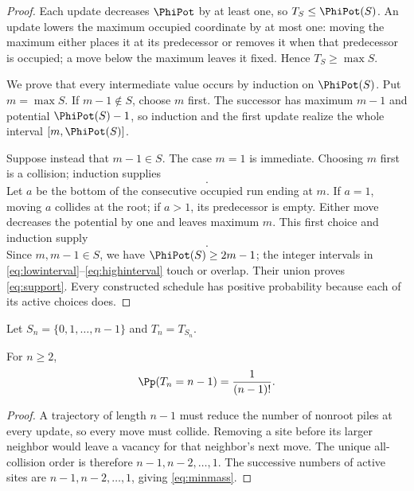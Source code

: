 \begin{proof}
Each update decreases $\PhiPot$ by at least one, so $T_S\leq\PhiPot(S)$.
An update lowers the maximum occupied coordinate by at most one: moving the
maximum either places it at its predecessor or removes it when that
predecessor is occupied; a move below the maximum leaves it fixed.  Hence
$T_S\geq\max S$.

We prove that every intermediate value occurs by induction on
$\PhiPot(S)$.  Put $m=\max S$.  If $m-1\notin S$, choose $m$ first.  The
successor has maximum $m-1$ and potential $\PhiPot(S)-1$, so induction and
the first update realize the whole interval $[m,\PhiPot(S)]$.

Suppose instead that $m-1\in S$.  The case $m=1$ is immediate.  Choosing
$m$ first is a collision; induction supplies
\begin{equation}
 [m,\PhiPot(S)-m+1].                                   \label{eq:lowinterval}
\end{equation}
Let $a$ be the bottom of the consecutive occupied run ending at $m$.
If $a=1$, moving $a$ collides at the root; if $a>1$, its predecessor is
empty.  Either move decreases the potential by one and leaves maximum $m$.
This first choice and induction supply
\begin{equation}
 [m+1,\PhiPot(S)].                                     \label{eq:highinterval}
\end{equation}
Since $m,m-1\in S$, we have $\PhiPot(S)\geq2m-1$; the integer intervals in
\eqref{eq:lowinterval}--\eqref{eq:highinterval} touch or overlap.  Their
union proves \eqref{eq:support}.  Every constructed schedule has positive
probability because each of its active choices does.
\end{proof}

Let $S_n=\{0,1,\ldots,n-1\}$ and $T_n=T_{S_n}$.

\begin{corollary}\label{cor:minmass}
For $n\geq2$,
\begin{equation}
 \Pp(T_n=n-1)=\frac{1}{(n-1)!}.                         \label{eq:minmass}
\end{equation}
\end{corollary}

\begin{proof}
A trajectory of length $n-1$ must reduce the number of nonroot piles at
every update, so every move must collide.  Removing a site before its larger
neighbor would leave a vacancy for that neighbor's next move.  The unique
all-collision order is therefore $n-1,n-2,\ldots,1$.  The successive numbers
of active sites are $n-1,n-2,\ldots,1$, giving \eqref{eq:minmass}.
\end{proof}

